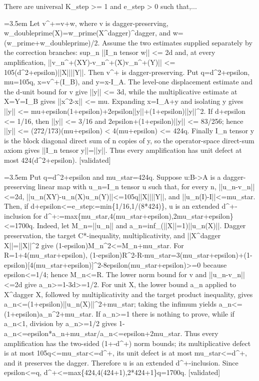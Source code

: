 \documentclass{article}
\newcommand{\step}[1]{\par\noindent\hangindent=3.5em\hangafter=1%
  \makebox[3.5em][l]{\textbf{#1.}}}
\newcommand{\steptag}[1]{\hfill{\small\textsf{[#1]}}}
\begin{document}
\begin{proofbox}{There are universal K\_step >= 1 and e\_step > 0 such that,...}
\step{1.4} Let v\textasciicircum{}+=v+w, where v is dagger-preserving, w\_doubleprime(X)=w\_prime(X\textasciicircum{}dagger)\textasciicircum{}dagger, and w=(w\_prime+w\_doubleprime)/2. Assume the two estimates supplied separately by the correction branches: sup\_n ||I\_n tensor w|| <= 2d and, at every amplification, ||v\_n\textasciicircum{}+(XY)-v\_n\textasciicircum{}+(X)v\_n\textasciicircum{}+(Y)|| <= 105(d\textasciicircum{}2+epsilon)||X||||Y||. Then v\textasciicircum{}+ is dagger-preserving. Put q=d\textasciicircum{}2+epsilon, mu=105q, x=v\textasciicircum{}+(I\_B), and y=x-I\_A. The level-one displacement estimate and the d-unit bound for v give ||y|| <= 3d, while the multiplicative estimate at X=Y=I\_B gives ||x\textasciicircum{}2-x|| <= mu. Expanding x=I\_A+y and isolating y gives ||y|| <= mu+epsilon(1+epsilon)+2epsilon||y||+(1+epsilon)||y||\textasciicircum{}2. If d+epsilon <= 1/16, then ||y|| <= 3/16 and 2epsilon+(1+epsilon)||y|| <= 83/256; hence ||y|| <= (272/173)(mu+epsilon) < 4(mu+epsilon) <= 424q. Finally I\_n tensor y is the block diagonal direct sum of n copies of y, so the operator-space direct-sum axiom gives ||I\_n tensor y||=||y||. Thus every amplification has unit defect at most 424(d\textasciicircum{}2+epsilon). \steptag{validated} \\[4pt]
\step{1.5} Put q=d\textasciicircum{}2+epsilon and mu\_star=424q. Suppose u:B->A is a dagger-preserving linear map with u\_n=I\_n tensor u such that, for every n, ||u\_n-v\_n||<=2d, ||u\_n(XY)-u\_n(X)u\_n(Y)||<=105q||X||||Y||, and ||u\_n(I)-I||<=mu\_star. Then, if d+epsilon<=e\_step:=min\{1/16,1/(8*424)\}, u is an extended d\textasciicircum{}+-inclusion for d\textasciicircum{}+:=max\{mu\_star,4(mu\_star+epsilon),2mu\_star+epsilon\}<=1700q. Indeed, let M\_n=||u\_n|| and a\_n=inf\_(||X||=1)||u\_n(X)||. Dagger preservation, the target C*-inequality, multiplicativity, and ||X\textasciicircum{}dagger X||=||X||\textasciicircum{}2 give (1-epsilon)M\_n\textasciicircum{}2<=M\_n+mu\_star. For R=1+4(mu\_star+epsilon), (1-epsilon)R\textasciicircum{}2-R-mu\_star=3(mu\_star+epsilon)+(1-epsilon)[4(mu\_star+epsilon)]\textasciicircum{}2-8epsilon(mu\_star+epsilon)>=0 because epsilon<=1/4; hence M\_n<=R. The lower norm bound for v and ||u\_n-v\_n||<=2d give a\_n>=1-3d>=1/2. For unit X, the lower bound a\_n applied to X\textasciicircum{}dagger X, followed by multiplicativity and the target product inequality, gives a\_n<=(1+epsilon)||u\_n(X)||\textasciicircum{}2+mu\_star; taking the infimum yields a\_n<=(1+epsilon)a\_n\textasciicircum{}2+mu\_star. If a\_n>=1 there is nothing to prove, while if a\_n<1, division by a\_n>=1/2 gives 1-a\_n<=epsilon*a\_n+mu\_star/a\_n<=epsilon+2mu\_star. Thus every amplification has the two-sided (1+-d\textasciicircum{}+) norm bounds; its multiplicative defect is at most 105q<=mu\_star<=d\textasciicircum{}+, its unit defect is at most mu\_star<=d\textasciicircum{}+, and it preserves the dagger. Therefore u is an extended d\textasciicircum{}+-inclusion. Since epsilon<=q, d\textasciicircum{}+<=max\{424,4(424+1),2*424+1\}q=1700q. \steptag{validated} \\[4pt]
\end{proofbox}
\end{document}
